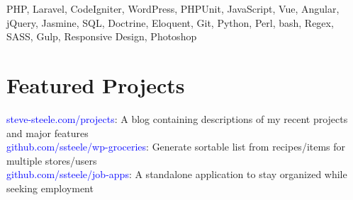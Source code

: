 \documentclass[margin,line]{resume}
\begin{document}
\begin{resume}

PHP, Laravel, CodeIgniter, WordPress, PHPUnit, JavaScript, Vue, Angular, jQuery, Jasmine, SQL, Doctrine, Eloquent, Git, Python, Perl, bash, Regex, SASS, Gulp, Responsive Design, Photoshop









\section{\mysidestyle Featured Projects}

\textcolor{blue}{steve-steele.com/projects}: A blog containing descriptions of my recent projects and major features\vspace{0.3mm}\\
\textcolor{blue}{github.com/ssteele/wp-groceries}: Generate sortable list from recipes/items for multiple stores/users\vspace{0.3mm}\\
\textcolor{blue}{github.com/ssteele/job-apps}: A standalone application to stay organized while seeking employment




\end{resume}
\end{document}
